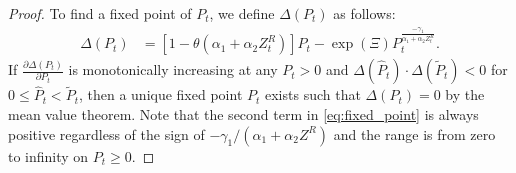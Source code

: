 \documentclass[11pt, a4paper]{article}
\begin{document}
\begin{proof}
    To find a fixed point of $P_{t}$, we define $\Delta(P_t)$ as follows:
    \begin{align}
        \Delta(P_t)
        &= [1 - \theta (\alpha_1 + \alpha_2 Z^{R}_{t})]P_t - \exp(\Xi) P_t^{\frac{-\gamma_1}{\alpha_1 + \alpha_2 Z^{R}_{t}}}\label{eq:fixed_point}.
    \end{align}
    If $\frac{\partial\Delta(P_t)}{\partial P_t}$ is monotonically increasing at any $P_{t}> 0$ and $\Delta(\hat{P}_t)\cdot \Delta(\tilde{P}_t)<0$ for $0\le \hat{P}_t < \tilde{P}_t$, then a unique fixed point $P_t$ exists such that $\Delta(P_t)=0$ by the mean value theorem. 
    Note that the second term in \eqref{eq:fixed_point} is always positive regardless of the sign of $-\gamma_1/(\alpha_1+\alpha_2 Z^R)$ and the range is from zero to infinity on $P_t\ge 0$.
    

\end{proof}
\end{document}
